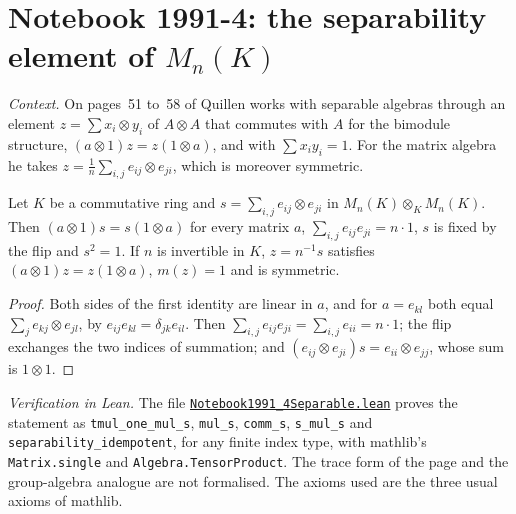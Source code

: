 \section[Notebook 1991-4: the separability element of $M_n(K)$]{Notebook 1991-4: the separability element of $M_n(K)$\protect{}}\label{sec:quillen-1991-4-separable}

\emph{Context.} On pages~51 to~58 of  Quillen works with separable algebras through an element $z = \sum x_i \otimes y_i$ of $A \otimes A$ that commutes with $A$ for the bimodule structure, $(a \otimes 1)z = z(1 \otimes a)$, and with $\sum x_iy_i = 1$. For the matrix algebra he takes $z = \frac1n\sum_{i,j} e_{ij} \otimes e_{ji}$, which is moreover symmetric.

\begin{encadre}
\begin{theoreme}\label{thm:quillen-1991-4-separable}
Let $K$ be a commutative ring and $s = \sum_{i,j} e_{ij} \otimes e_{ji}$ in $M_n(K) \otimes_K M_n(K)$. Then $(a \otimes 1)s = s(1 \otimes a)$ for every matrix $a$, $\sum_{i,j} e_{ij}e_{ji} = n \cdot 1$, $s$ is fixed by the flip and $s^2 = 1$. If $n$ is invertible in $K$, $z = n^{-1}s$ satisfies $(a \otimes 1)z = z(1 \otimes a)$, $m(z) = 1$ and is symmetric.
\end{theoreme}
\end{encadre}

\begin{proof}
Both sides of the first identity are linear in $a$, and for $a = e_{kl}$ both equal $\sum_j e_{kj} \otimes e_{jl}$, by $e_{ij}e_{kl} = \delta_{jk}e_{il}$. Then $\sum_{i,j}e_{ij}e_{ji} = \sum_{i,j}e_{ii} = n \cdot 1$; the flip exchanges the two indices of summation; and $(e_{ij} \otimes e_{ji})s = e_{ii} \otimes e_{jj}$, whose sum is $1 \otimes 1$.
\end{proof}

\emph{Verification in Lean.} The file \href{\leanblobmain/Notebook1991_4Separable.lean}{\texttt{Notebook1991\_4Separable.\allowbreak{}lean}} proves the statement as \texttt{tmul\_one\_mul\_s}, \texttt{mul\_s}, \texttt{comm\_s}, \texttt{s\_mul\_s} and \texttt{separability\_idempotent}, for any finite index type, with mathlib's \texttt{Matrix.single} and \texttt{Algebra.TensorProduct}. The trace form of the page and the group-algebra analogue are not formalised. The axioms used are the three usual axioms of mathlib.

